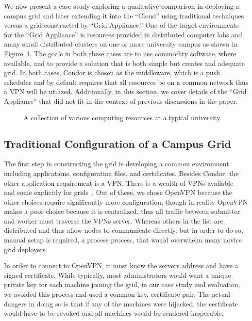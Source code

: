 \documentclass[conference]{IEEEtran}
\begin{document}
We now present a case study exploring a qualitative comparison in deploying a
campus grid and later extending it into the ``Cloud'' using traditional
techniques versus a grid constructed by ``Grid Appliance.''  One of the target
environments for the ``Grid Appliance'' is resources provided in distributed
computer labs and many small distributed clusters on one or more university
campus as shown in Figure~\ref{fig:unconnected}.  The goals in both these cases
are to use commodity software, where available, and to provide a solution that
is both simple but creates and adequate grid.  In both cases, Condor is chosen
as the middleware, which is a push scheduler and by default requires that all
resources be on a common network thus a VPN will be utilized.  Additionally, in
this section, we cover details of the ``Grid Appliance'' that did not fit in
the context of previous discussions in the paper.

\begin{figure}[ht]
\centering
{}
\caption{A collection of various computing resources at a typical university.}
\label{fig:unconnected}
\end{figure}

\subsection{Traditional Configuration of a Campus Grid}

The first step in constructing the grid is developing a common environment
including applications, configuration files, and certificates.  Besides Condor,
the other application requirement is a VPN.  There is a wealth of VPNs
available~\cite{hamachi, openvpn, tinc} and some explicitly for
grids~\cite{violin, vine, vnet}.  Out of these, we chose OpenVPN because the
other choices require significantly more configuration, though in reality
OpenVPN makes a poor choice because it is centralized, thus all traffic between
submitter and worker must traverse the VPNs server.  Whereas others in the list
are distributed and thus allow nodes to communicate directly, but in order to
do so, manual setup is required, a process process, that would overwhelm many
novice grid deployers.

In order to connect to OpenVPN, it must know the servers address and have a
signed certificate.  While typically, most administrators would want a unique
private key for each machine joining the grid, in our case study and
evaluation, we avoided this process and used a common key, certificate pair.
The actual dangers in doing so is that if any of the machines were hijacked,
the certificate would have to be revoked and all machines would be rendered
inoperable.
\end{document}
